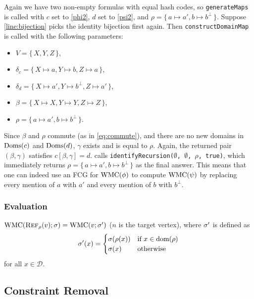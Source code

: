 \begin{example}
  Again we have two non-empty formulas with equal hash codes, so \texttt{generateMaps} is called with $c$ set to \cref{phi2}, $d$ set to \cref{psi2}, and $\rho = \{\, a \mapsto a', b \mapsto b^\bot \,\}$. Suppose \cref{line:bijection} picks the identity bijection first again. Then \texttt{constructDomainMap} is called with the following parameters:
  \begin{itemize}
  \item $V = \{\, X, Y, Z \,\}$,
  \item $\delta_c = \{\, X \mapsto a, Y \mapsto b, Z \mapsto a \,\}$,
  \item $\delta_d = \{\, X \mapsto a', Y \mapsto b^\bot, Z \mapsto a' \,\}$,
  \item $\beta = \{\, X \mapsto X, Y \mapsto Y, Z \mapsto Z \,\}$,
  \item $\rho = \{\, a \mapsto a', b \mapsto b^\bot \,\}$.
  \end{itemize}
  Since $\beta$ and $\rho$ commute (as in \cref{eq:commute}), and there are no new domains in $\operatorname{Doms}(c)$ and $\operatorname{Doms}(d)$, $\gamma$ exists and is equal to $\rho$. Again, the returned pair $(\beta, \gamma)$ satisfies $c[\beta, \gamma] = d$.  calls \texttt{identifyRecursion($\emptyset$, $\emptyset$, $\rho$, true)}, which immediately returns $\rho = \{\, a \mapsto a', b \mapsto b^\bot \,\}$ as the final answer. This means that one can indeed use an FCG for $\operatorname{WMC}(\phi)$ to compute $\operatorname{WMC}(\psi)$ by replacing every mention of $a$ with $a'$ and every mention of $b$ with $b^\bot$.
\end{example}

\subsubsection{Evaluation}

$\operatorname{WMC}(\operatorname{\textsc{Ref}}_\rho(v); \operatorname{\sigma}) = \operatorname{WMC}(v; \operatorname{\sigma}')$ ($n$ is the target vertex), where $\operatorname{\sigma}'$ is defined as
\[
\operatorname{\sigma}'(x) =
\begin{cases}
  \operatorname{\sigma}(\rho(x)) & \text{if } x \in \operatorname{dom}(\rho) \\
  \operatorname{\sigma}(x) & \text{otherwise}
\end{cases}
\]
for all $x \in \mathcal{D}$.

\subsection{Constraint Removal}

